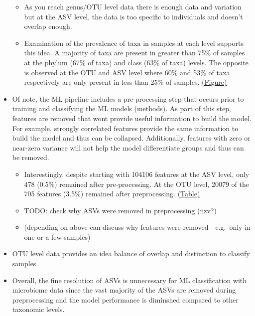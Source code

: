 \documentclass[
]{article}
\providecommand{\tightlist}{%
  \setlength{\itemsep}{0pt}\setlength{\parskip}{0pt}}
\begin{document}
\begin{itemize}
  \begin{itemize}
  \tightlist
  \item
    As you reach genus/OTU level data there is enough data and variation
    but at the ASV level, the data is too specific to individuals and
    doesn't overlap enough.
  \item
    Examination of the prevalence of taxa in samples at each level
    supports this idea. A majority of taxa are present in greater than
    75\% of samples at the phylum (67\% of taxa) and class (63\% of
    taxa) levels. The opposite is observed at the OTU and ASV level
    where 60\% and 53\% of taxa respectively are only present in less
    than 25\% of samples.
    \protect\hyperlink{prevalence-of-taxa-in-samples}{(Figure)}
  \end{itemize}
\item
  Of note, the ML pipeline includes a pre-processing step that occurs
  prior to training and classifying the ML models (methods). As part of
  this step, features are removed that wont provide useful information
  to build the model. For example, strongly correlated features provide
  the same information to build the model and thus can be collapsed.
  Additionally, features with zero or near-zero variance will not help
  the model differentiate groups and thus can be removed.

  \begin{itemize}
  \tightlist
  \item
    Interestingly, despite starting with 104106 features at the ASV
    level, only 478 (0.5\%) remained after pre-processing. At the OTU
    level, 20079 of the 705 features (3.5\%) remained after
    preprocessing. \protect\hyperlink{summary-of-features}{(Table)}
  \item
    TODO: check why ASVs were removed in preprocessing (nzv?)
  \item
    (depending on above can discuss why features were removed -
    e.g.~only in one or a few samples)
  \end{itemize}
\item
  OTU level data provides an idea balance of overlap and distinction to
  classify samples.
\item
  Overall, the fine resolution of ASVs is unnecessary for ML
  classification with microbiome data since the vast majority of the
  ASVs are removed during preprocessing and the model performance is
  diminshed compared to other taxonomic levels.
\end{itemize}
\end{document}
